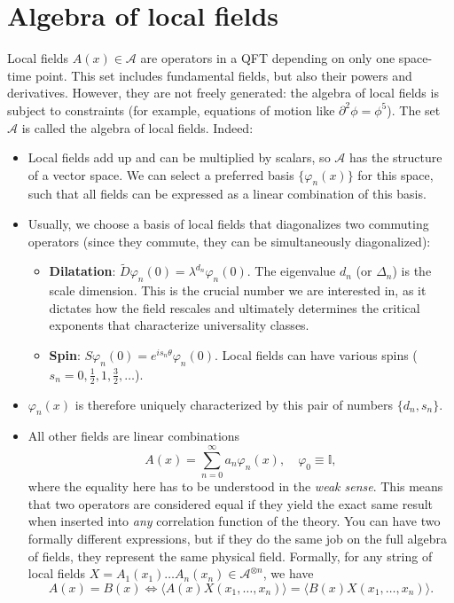 \section{Algebra of local fields}
Local fields \(A(x)\in\mathcal{A}\) are operators in a QFT depending on only one space-time point. This set includes fundamental fields, but also their powers and derivatives. However, they are not freely generated: the algebra of local fields is subject to constraints (for example, equations of motion like \(\partial^2\phi = \phi^5\)). The set \(\mathcal{A}\) is called the algebra of local fields. Indeed:
\begin{itemize}
    \item Local fields add up and can be multiplied by scalars, so \(\mathcal{A}\) has the structure of a vector space. We can select a preferred basis \(\{\varphi_n(x)\}\) for this space, such that all fields can be expressed as a linear combination of this basis.
    \item Usually, we choose a basis of local fields that diagonalizes two commuting operators (since they commute, they can be simultaneously diagonalized):
          \begin{itemize}
              \item \textbf{Dilatation}: \(\tilde{D}\varphi_{n}(0)=\lambda^{d_{n}}\varphi_{n}(0)\). The eigenvalue \(d_{n}\) (or \(\Delta_n\)) is the scale dimension. This is the crucial number we are interested in, as it dictates how the field rescales and ultimately determines the critical exponents that characterize universality classes.
              \item \textbf{Spin}: \(S\varphi_{n}(0)=e^{is_{n}\theta}\varphi_{n}(0)\). Local fields can have various spins (\(s_n = 0, \tfrac{1}{2}, 1, \tfrac{3}{2}, \dots\)).
          \end{itemize}
    \item \(\varphi_{n}(x)\) is therefore uniquely characterized by this pair of numbers \(\{d_{n},s_{n}\}\).
    \item All other fields are linear combinations
          \[
              A(x)=\sum_{n=0}^{\infty}a_{n}\varphi_{n}(x), \quad \varphi_{0}\equiv\mathbb{I},
          \]
          where the equality here has to be understood in the \textit{weak sense}. This means that two operators are considered equal if they yield the exact same result when inserted into \textit{any} correlation function of the theory. You can have two formally different expressions, but if they do the same job on the full algebra of fields, they represent the same physical field. Formally, for any string of local fields \(X=A_{1}(x_{1})\dots A_{n}(x_{n})\in\mathcal{A}^{\otimes n}\), we have
          \[
              A(x)=B(x)\Leftrightarrow\langle A(x)X(x_{1},\dots,x_{n})\rangle=\langle B(x)X(x_{1},\dots,x_{n})\rangle.
          \]
\end{itemize}

